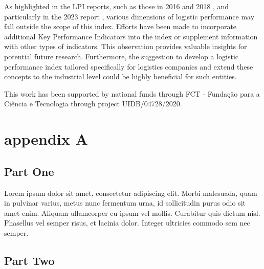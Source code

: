 \documentclass[sigconf]{acmart}
\begin{document}
As highlighted in the LPI reports, such as those in 2016 and 2018 \cite{WBreport2016, WBreport2018}, and particularly in the 2023 report \cite{WBreport2023}, various dimensions of logistic performance may fall outside the scope of this index. Efforts have been made to incorporate additional Key Performance Indicators into the index or supplement information with other types of indicators. This observation provides valuable insights for potential future research. Furthermore, the suggestion to develop a logistic performance index tailored specifically for logistics companies and extend these concepts to the industrial level could be highly beneficial for such entities.




\begin{acks}
This work has been supported by national funds through FCT - Fundação para a Ciência e Tecnologia through project UIDB/04728/2020.
\end{acks}





\appendix

\section{appendix A}

\subsection{Part One}

Lorem ipsum dolor sit amet, consectetur adipiscing elit. Morbi
malesuada, quam in pulvinar varius, metus nunc fermentum urna, id
sollicitudin purus odio sit amet enim. Aliquam ullamcorper eu ipsum
vel mollis. Curabitur quis dictum nisl. Phasellus vel semper risus, et
lacinia dolor. Integer ultricies commodo sem nec semper.

\subsection{Part Two}
\end{document}
